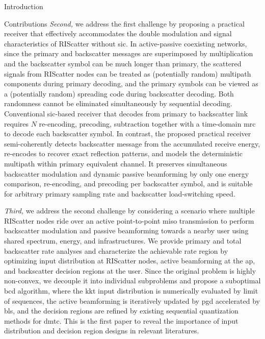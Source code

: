 \documentclass[journal]{IEEEtran}
\begin{document}
\begin{section}{Introduction}
\begin{subsection}{Contributions}
		\emph{Second,} we address the first challenge by proposing a practical receiver that effectively accommodates the double modulation and signal characteristics of RIScatter without \gls{sic}.
		In active-passive coexisting networks, since the primary and backscatter messages are superimposed by multiplication and the backscatter symbol can be much longer than primary, the scattered signals from RIScatter nodes can be treated as (potentially random) multipath components during primary decoding, and the primary symbols can be viewed as a (potentially random) spreading code during backscatter decoding.
		Both randomness cannot be eliminated simultaneously by sequential decoding.
		Conventional \gls{sic}-based receiver that decodes from primary to backscatter link requires $N$ re-encoding, precoding, subtraction together with a time-domain \gls{mrc} to decode each backscatter symbol.
		In contrast, the proposed practical receiver semi-coherently detects backscatter message from the accumulated receive energy, re-encodes to recover exact reflection patterns, and models the deterministic multipath within primary equivalent channel.
		It preserves simultaneous backscatter modulation and dynamic passive beamforming by only one energy comparison, re-encoding, and precoding per backscatter symbol, and is suitable for arbitrary primary sampling rate and backscatter load-switching speed.

		\emph{Third,} we address the second challenge by considering a scenario where multiple RIScatter nodes ride over an active point-to-point \gls{miso} transmission to perform backscatter modulation and passive beamforming towards a nearby user using shared spectrum, energy, and infrastructures.
		We provide primary and total backscatter rate analyses and characterize the achievable rate region by optimizing input distribution at RIScatter nodes, active beamforming at the \gls{ap}, and backscatter decision regions at the user.
		Since the original problem is highly non-convex, we decouple it into individual subproblems and propose a suboptimal \gls{bcd} algorithm, where the \gls{kkt} input distribution is numerically evaluated by limit of sequences, the active beamforming is iteratively updated by \gls{pgd} accelerated by \gls{bls}, and the decision regions are refined by existing sequential quantization methods for \gls{dmtc}.
		This is the first paper to reveal the importance of input distribution and decision region designs in relevant literatures.


\end{subsection}
\end{section}
\end{document}
